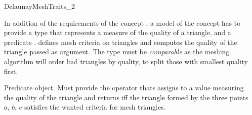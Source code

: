 \begin{ccRefConcept}{DelaunayMeshTraits_2}

\ccRefines


\ccDefinition

In addition of the requirements of the concept
, a model of the concept
\ccRefName{} has to provide a type  that represents a
measure of the quality of a triangle, and a predicate .
 defines mesh criteria on triangles and computes the
quality of the triangle passed as argument. The type 
must be \emph{comparable} as the meshing algorithm will order bad
triangles by quality, to split those with smallest quality first.

\ccTypes


 {Predicate object. Must provide the operator
  thats assigns to  a value measuring the quality of the
  triangle and returns  iff the triangle formed by the three
  points $a$, $b$, $c$ satisfies the wanted criteria for mesh
  triangles.}




\ccHasModels
{}\\

\end{ccRefConcept}

